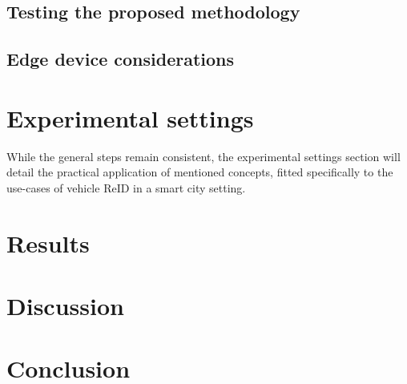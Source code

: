 \documentclass[conference]{IEEEtran} %
\begin{document}
	\subsection{Testing the proposed methodology}
	
	
	
	
	\subsection{Edge device considerations}
	
	
	
	
	 
		
	
	\section{Experimental settings}
	While the general steps remain consistent, the experimental settings section will detail the practical application of mentioned concepts, fitted specifically to the use-cases of vehicle ReID in a smart city setting. 	
	

	\section{Results}
	
	\section{Discussion}
	
	\section{Conclusion}
	
	
	
\end{document}
